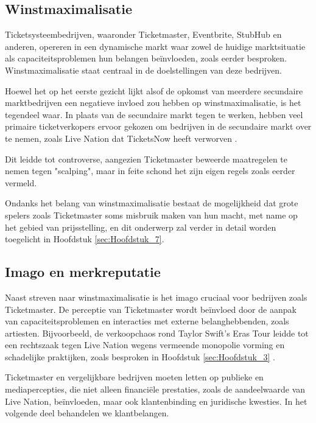 \subsection{Winstmaximalisatie}
Ticketsysteembedrijven, waaronder Ticketmaster, Eventbrite, StubHub en anderen, opereren in een dynamische markt waar zowel de huidige 
marktsituatie als capaciteitsproblemen hun belangen beïnvloeden, zoals eerder besproken. Winstmaximalisatie staat centraal in de doelstellingen 
van deze bedrijven.

\vspace{5mm}
Hoewel het op het eerste gezicht lijkt alsof de opkomst van meerdere secundaire marktbedrijven een negatieve invloed zou hebben op 
winstmaximalisatie, is het tegendeel waar. In plaats van de secundaire markt tegen te werken, hebben veel primaire ticketverkopers ervoor gekozen 
om bedrijven in de secundaire markt over te nemen, zoals Live Nation dat TicketsNow heeft verworven \cite{Holmstrom2019}.

\vspace{5mm}
Dit leidde tot controverse, aangezien Ticketmaster beweerde maatregelen te nemen tegen "scalping", maar in feite schond het zijn eigen regels zoals 
eerder vermeld. \cite{CBC:online}

\vspace{5mm}
Ondanks het belang van winstmaximalisatie bestaat de mogelijkheid dat grote spelers zoals Ticketmaster soms misbruik maken van hun macht, met name 
op het gebied van prijsstelling, en dit onderwerp zal verder in detail worden toegelicht in Hoofdstuk \ref{sec:Hoofdstuk_7}.


\subsection{Imago en merkreputatie}

Naast streven naar winstmaximalisatie is het imago cruciaal voor bedrijven zoals Ticketmaster. De perceptie van Ticketmaster wordt beïnvloed door 
de aanpak van capaciteitsproblemen en interacties met externe belanghebbenden, zoals artiesten. Bijvoorbeeld, de verkoopchaos rond Taylor Swift's 
Eras Tour leidde tot een rechtszaak tegen Live Nation wegens vermeende monopolie vorming en schadelijke praktijken, zoals besproken in Hoofdstuk \ref{sec:Hoofdstuk_3}
\cite{Knack:online}.

\vspace{5mm}

Ticketmaster en vergelijkbare bedrijven moeten letten op publieke en mediapercepties, die niet alleen financiële prestaties, zoals de aandeelwaarde 
van Live Nation, beïnvloeden, maar ook klantenbinding en juridische kwesties. In het volgende deel behandelen we klantbelangen.

